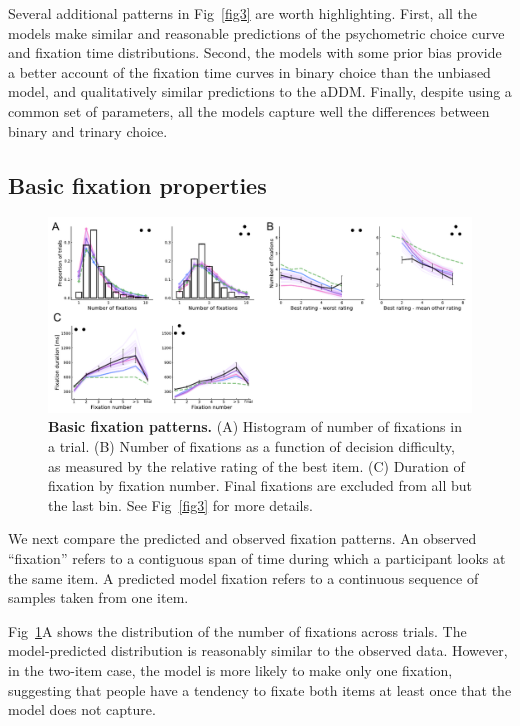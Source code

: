 Several additional patterns in Fig~\ref{fig3} are worth highlighting. First, all the models make similar and reasonable predictions of the psychometric choice curve and fixation time distributions. Second, the models with some prior bias provide a better account of the fixation time curves in binary choice than the unbiased model, and qualitatively similar predictions to the aDDM. Finally, despite using a common set of parameters, all the models capture well the differences between binary and trinary choice. 

\subsection{Basic fixation properties}


\begin{figure}[t!]
  \centering
  \includegraphics[width=\textwidth]{figs/attention/Fig4.pdf}
  \caption{\textbf{Basic fixation patterns.}
  (A) Histogram of number of fixations in a trial.
  (B) Number of fixations as a function of decision difficulty, as measured by the relative rating of the best item.
  (C) Duration of fixation by fixation number. Final fixations are excluded from all but the last bin.
  See Fig~\ref{fig3} for more details.
  }
  \label{fig4}
\end{figure}

 
We next compare the predicted and observed fixation patterns. An observed ``fixation'' refers to a contiguous span of time during which a participant looks at the same item. A predicted model fixation refers to a continuous sequence of samples taken from one item.


Fig~\ref{fig4}A shows the distribution of the number of fixations across trials. The model-predicted distribution is reasonably similar to the observed data. However, in the two-item case, the model is more likely to make only one fixation, suggesting that people have a tendency to fixate both items at least once that the model does not capture. 

